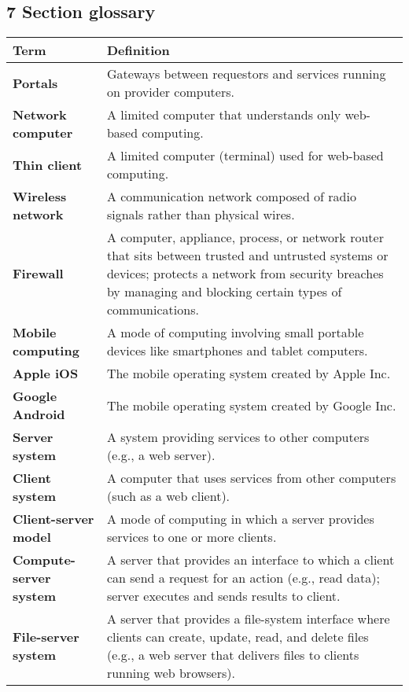\documentclass{article}
\begin{document}
\subsection*{7 Section glossary}
\centering
\begin{tabular}{>{\raggedright}p{} >{\raggedright\arraybackslash}p{}}
\toprule
\textbf{Term} & \textbf{Definition} \\
\midrule
\textbf{Portals} & Gateways between requestors and services running on provider computers. \\
\textbf{Network computer} & A limited computer that understands only web-based computing. \\
\textbf{Thin client} & A limited computer (terminal) used for web-based computing. \\
\textbf{Wireless network} & A communication network composed of radio signals rather than physical wires. \\
\textbf{Firewall} & A computer, appliance, process, or network router that sits between trusted and untrusted systems or devices; protects a network from security breaches by managing and blocking certain types of communications. \\
\textbf{Mobile computing} & A mode of computing involving small portable devices like smartphones and tablet computers. \\
\textbf{Apple iOS} & The mobile operating system created by Apple Inc. \\
\textbf{Google Android} & The mobile operating system created by Google Inc. \\
\textbf{Server system} & A system providing services to other computers (e.g., a web server). \\
\textbf{Client system} & A computer that uses services from other computers (such as a web client). \\
\textbf{Client-server model} & A mode of computing in which a server provides services to one or more clients. \\
\textbf{Compute-server system} & A server that provides an interface to which a client can send a request for an action (e.g., read data); server executes and sends results to client. \\
\textbf{File-server system} & A server that provides a file-system interface where clients can create, update, read, and delete files (e.g., a web server that delivers files to clients running web browsers). \\

\end{tabular}
\end{document}
